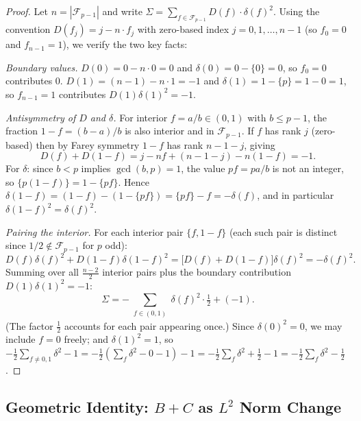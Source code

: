 \documentclass[11pt]{article}
\theoremstyle{definition}
\newcommand{\F}{\mathcal{F}}
\begin{document}
\begin{proof}
Let $n = |\F_{p-1}|$ and write $\Sigma = \sum_{f \in \F_{p-1}} D(f)\cdot\delta(f)^2$.
Using the convention $D(f_j) = j - n \cdot f_j$ with
zero-based index $j = 0, 1, \ldots, n-1$ (so $f_0 = 0$ and
$f_{n-1} = 1$), we verify the two key facts:

\medskip
\noindent\textit{Boundary values.}
$D(0) = 0 - n\cdot 0 = 0$ and $\delta(0) = 0 - \{0\} = 0$, so $f_0=0$
contributes $0$.
$D(1) = (n-1) - n\cdot 1 = -1$ and $\delta(1) = 1 - \{p\} = 1 - 0 = 1$,
so $f_{n-1}=1$ contributes $D(1)\delta(1)^2 = -1$.

\medskip
\noindent\textit{Antisymmetry of $D$ and $\delta$.}
For interior $f = a/b \in (0,1)$ with $b \le p-1$, the fraction
$1-f = (b-a)/b$ is also interior and in $\F_{p-1}$.
If $f$ has rank $j$ (zero-based) then by Farey symmetry
$1-f$ has rank $n-1-j$, giving
\begin{equation*}
D(f) + D(1-f) = j - nf + (n-1-j) - n(1-f) = -1.
\end{equation*}
For $\delta$: since $b < p$ implies $\gcd(b,p)=1$, the value
$pf = pa/b$ is not an integer, so $\{p(1-f)\} = 1 - \{pf\}$.
Hence $\delta(1-f) = (1-f) - (1-\{pf\}) = \{pf\} - f = -\delta(f)$,
and in particular $\delta(1-f)^2 = \delta(f)^2$.

\medskip
\noindent\textit{Pairing the interior.}
For each interior pair $\{f, 1-f\}$ (each such pair is distinct
since $1/2 \notin \F_{p-1}$ for $p$ odd):
\begin{equation*}
D(f)\delta(f)^2 + D(1-f)\delta(1-f)^2
= \bigl[D(f) + D(1-f)\bigr]\delta(f)^2 = -\delta(f)^2.
\end{equation*}
Summing over all $\frac{n-2}{2}$ interior pairs plus the
boundary contribution $D(1)\delta(1)^2 = -1$:
\begin{equation*}
\Sigma = -\sum_{\substack{f \in (0,1)}} \delta(f)^2\cdot\tfrac{1}{2} + (-1).
\end{equation*}
(The factor $\frac{1}{2}$ accounts for each pair appearing once.)
Since $\delta(0)^2 = 0$, we may include $f=0$ freely; and
$\delta(1)^2 = 1$, so
$-\tfrac{1}{2}\sum_{f\ne 0,1}\delta^2 - 1
= -\tfrac{1}{2}\!\left(\sum_f \delta^2 - 0 - 1\right) - 1
= -\tfrac{1}{2}\sum_f \delta^2 + \tfrac{1}{2} - 1
= -\tfrac{1}{2}\sum_f \delta^2 - \tfrac{1}{2}$.
\end{proof}


\subsection{Geometric Identity: $B+C$ as $L^2$ Norm Change}
\end{document}
